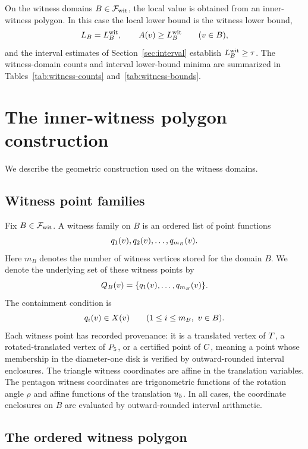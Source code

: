 \documentclass[11pt]{article}
\begin{document}
On the witness domains \(B\in\mathcal{F}_{\mathrm{wit}}\), the local value is obtained from an inner-witness polygon.  In this case the local lower bound is the witness lower bound,
\[
L_B=L_B^{\mathrm{wit}},
\qquad
A(v)\ge L_B^{\mathrm{wit}}
\qquad(v\in B),
\]
and the interval estimates of Section~\ref{sec:interval} establish \(L_B^{\mathrm{wit}}\ge\tau\).  The witness-domain counts and interval lower-bound minima are summarized in Tables~\ref{tab:witness-counts} and~\ref{tab:witness-bounds}.

\section{The inner-witness polygon construction}\label{sec:witness}

We describe the geometric construction used on the witness domains.

\subsection{Witness point families}

Fix \(B\in\mathcal{F}_{\mathrm{wit}}\).  A witness family on \(B\) is an ordered list of point functions
\[
q_1(v),q_2(v),\ldots,q_{m_B}(v).
\]
Here \(m_B\) denotes the number of witness vertices stored for the domain \(B\).  We denote the underlying set of these witness points by
\[
Q_B(v)=\{q_1(v),\ldots,q_{m_B}(v)\}.
\]
The containment condition is
\[
q_i(v)\in X(v)
\qquad(1\le i\le m_B,\ v\in B).
\]
Each witness point has recorded provenance: it is a translated vertex of \(T\), a rotated-translated vertex of \(P_5\), or a certified point of \(C\), meaning a point whose membership in the diameter-one disk is verified by outward-rounded interval enclosures.  The triangle witness coordinates are affine in the translation variables.  The pentagon witness coordinates are trigonometric functions of the rotation angle \(\rho\) and affine functions of the translation \(u_5\).  In all cases, the coordinate enclosures on \(B\) are evaluated by outward-rounded interval arithmetic.

\subsection{The ordered witness polygon}
\end{document}
